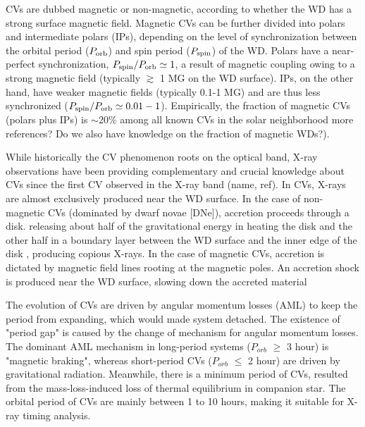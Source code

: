 \documentclass[fleqn,usenatbib]{mnras}
\begin{document}
CVs are dubbed magnetic or non-magnetic, according to whether the WD has a strong surface magnetic field. Magnetic CVs can be further divided into polars and intermediate polars (IPs), depending on the level of synchronization between the orbital period ($P_{\rm orb}$) and spin period ($P_{\rm spin}$) of the WD. Polars have a near-perfect synchronization, $P_{\rm spin}/P_{\rm orb}\simeq 1$, a result of magnetic coupling owing to a strong magnetic field (typically $\gtrsim$ 1 MG on the WD surface).
IPs, on the other hand, have weaker magnetic fields (typically 0.1-1 MG) and are thus less synchronized ($P_{\rm spin}/P_{\rm orb}\simeq 0.01-1$).
Empirically, the fraction of  magnetic CVs (polars plus IPs) is $\sim$20\% among all known CVs in the solar neighborhood \cite{2003A&A...404..301R} more references? Do we also have knowledge on the fraction of magnetic WDs?).   

While historically the CV phenomenon roots on the optical band, X-ray observations have been providing complementary and crucial knowledge about CVs since the first CV observed in the X-ray band (name, ref). 
In CVs, X-rays are almost exclusively produced near the WD surface. 
In the case of non-magnetic CVs (dominated by dwarf novae [DNe]), accretion proceeds through a disk. releasing about half of the gravitational energy in heating the disk and the other half in a boundary layer between the WD surface and the inner edge of the disk \citep{2001cvs..book.....H}, producing copious X-rays.    
In the case of magnetic CVs, accretion is dictated by magnetic field lines rooting at the magnetic poles. An accretion shock is produced near the WD surface, slowing down the accreted material 


The evolution of CVs are driven by angular momentum losses (AML) to keep the period from expanding, which would made system detached. The existence of  "period gap" is caused by the change of mechanism for angular momentum losses.  The dominant AML mechanism in long-period
systems ($P_{orb}$ $\geq$ 3 hour) is "magnetic braking", whereas short-period CVs ($P_{orb}$ $\leq$ 2 hour) are  driven by gravitational radiation. Meanwhile, there is a minimum period of CVs, resulted from the mass-loss-induced loss of thermal equilibrium in companion star. The orbital period of CVs are mainly between 1 to 10 hours, making it suitable for X-ray timing analysis. 
\end{document}
